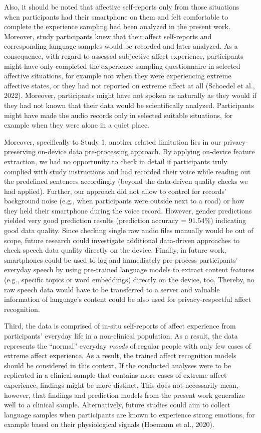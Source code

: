\documentclass[
  english,
  man,floatsintext]{apa6}
\begin{document}
Also, it should be noted that affective self-reports only from those situations when participants had their smartphone on them and felt comfortable to complete the experience sampling had been analyzed in the present work. Moreover, study participants knew that their affect self-reports and corresponding language samples would be recorded and later analyzed. As a consequence, with regard to assessed subjective affect experience, participants might have only completed the experience sampling questionnaire in selected affective situations, for example not when they were experiencing extreme affective states, or they had not reported on extreme affect at all (Schoedel et al., 2022). Moreover, participants might have not spoken as naturally as they would if they had not known that their data would be scientifically analyzed. Participants might have made the audio records only in selected suitable situations, for example when they were alone in a quiet place.

Moreover, specifically to Study 1, another related limitation lies in our privacy-preserving on-device data pre-processing approach. By applying on-device feature extraction, we had no opportunity to check in detail if participants truly complied with study instructions and had recorded their voice while reading out the predefined sentences accordingly (beyond the data-driven quality checks we had applied). Further, our approach did not allow to control for records' background noise (e.g., when participants were outside next to a road) or how they held their smartphone during the voice record. However, gender predictions yielded very good prediction results (prediction accuracy = 91.54\%) indicating good data quality. Since checking single raw audio files manually would be out of scope, future research could investigate additional data-driven approaches to check speech data quality directly on the device. Finally, in future work, smartphones could be used to log and immediately pre-process participants' everyday speech by using pre-trained language models to extract content features (e.g., specific topics or word embeddings) directly on the device, too. Thereby, no raw speech data would have to be transferred to a server and valuable information of language's content could be also used for privacy-respectful affect recognition.

Third, the data is comprised of in-situ self-reports of affect experience from participants' everyday life in a non-clinical population. As a result, the data represents the ``normal'' everyday \emph{moods} of regular people with only few cases of extreme affect experience. As a result, the trained affect recognition models should be considered in this context. If the conducted analyses were to be replicated in a clinical sample that contains more cases of extreme affect experience, findings might be more distinct. This does not necessarily mean, however, that findings and prediction models from the present work generalize well to a clinical sample. Alternatively, future studies could aim to collect language samples when participants are known to experience strong emotions, for example based on their physiological signals (Hoemann et al., 2020).
\end{document}
